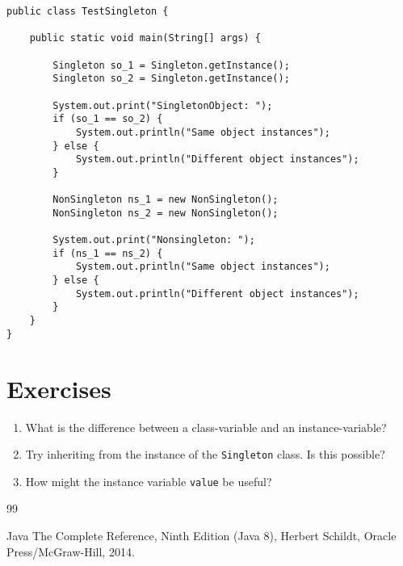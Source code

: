 \documentclass[12pt]{article}
\begin{document}
\begin{lstlisting}[label=JavaTESTSingleton,frame=lines,caption=Basic Singleton and Non-Singleton Test]
public class TestSingleton {
	
	public static void main(String[] args) {
		
		Singleton so_1 = Singleton.getInstance();
		Singleton so_2 = Singleton.getInstance();

		System.out.print("SingletonObject: ");
		if (so_1 == so_2) {
			System.out.println("Same object instances");
		} else {
			System.out.println("Different object instances");
		}
		
		NonSingleton ns_1 = new NonSingleton();
		NonSingleton ns_2 = new NonSingleton();
		
		System.out.print("Nonsingleton: ");
		if (ns_1 == ns_2) {
			System.out.println("Same object instances");
		} else {
			System.out.println("Different object instances");
		}
	}
}
\end{lstlisting}

%
%
\pagebreak
%
%

%
%
\section{Exercises}

%
%
%


\begin{enumerate}

\item
What is the difference between a class-variable and an instance-variable?

\item
Try inheriting from the instance of the \lstinline|Singleton| class.
Is this possible?

\item 
How might the instance variable \lstinline|value| be useful?



\end{enumerate}

%

%
%
%
\pagebreak
%
%

%
\begin {thebibliography}{99}
%
 
  Java The Complete Reference, Ninth Edition (Java 8),
	Herbert Schildt, Oracle Press/McGraw-Hill, 2014.


\end {thebibliography}
\end{document}
